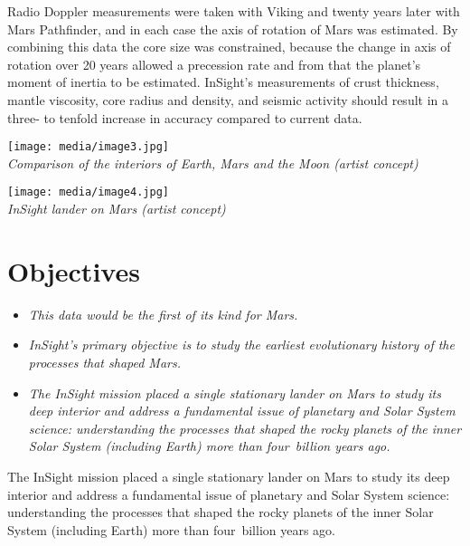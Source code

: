Radio Doppler measurements were taken with Viking and twenty years later
with Mars Pathfinder, and in each case the axis of rotation of Mars was
estimated. By combining this data the core size was constrained, because
the change in axis of rotation over 20 years allowed a precession rate
and from that the planet's moment of inertia to be estimated. InSight's
measurements of crust thickness, mantle viscosity, core radius and
density, and seismic activity should result in a three- to tenfold
increase in accuracy compared to current data.

\texttt{[image: media/image3.jpg]}\\
\emph{Comparison of the interiors of Earth, Mars and the Moon (artist
concept)}

\texttt{[image: media/image4.jpg]}\\
\emph{InSight lander on Mars (artist concept)}

\section{Objectives}\label{objectives}

\begin{itemize}
\item
  \emph{This data would be the first of its kind for Mars.}
\item
  \emph{InSight's primary objective is to study the earliest
  evolutionary history of the processes that shaped Mars.}
\item
  \emph{The InSight mission placed a single stationary lander on Mars to
  study its deep interior and address a fundamental issue of planetary
  and Solar System science: understanding the processes that shaped the
  rocky planets of the inner Solar System (including Earth) more than
  four~billion years ago.}
\end{itemize}

The InSight mission placed a single stationary lander on Mars to study
its deep interior and address a fundamental issue of planetary and Solar
System science: understanding the processes that shaped the rocky
planets of the inner Solar System (including Earth) more than
four~billion years ago.

